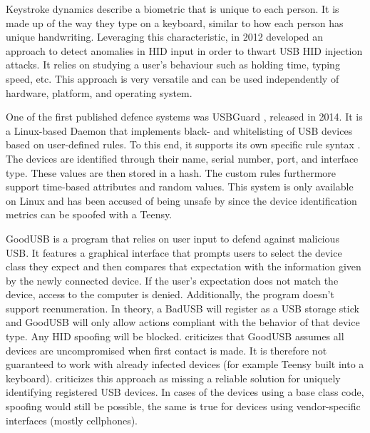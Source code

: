 Keystroke dynamics describe a biometric that is unique to each person. It is made up of the way they type on a keyboard, similar to how each person has unique handwriting. Leveraging this characteristic,  in 2012 \cite{barbhuiyaAnomalyBasedApproach2012} developed an approach to detect anomalies in HID input in order to thwart USB HID injection attacks. It relies on studying a user's behaviour such as holding time, typing speed, etc. This approach is very versatile and can be used independently of hardware, platform, and operating system. 

One of the first published defence systems was USBGuard \cite{HomeUSBGuard}, released in 2014. It is a Linux-based Daemon that implements black- and whitelisting of USB devices based on user-defined rules. To this end, it supports its own specific rule syntax \cite{RuleLanguageUSBGuard}. The devices are identified through their name, serial number, port, and interface type. These values are then stored in a hash. The custom rules furthermore support time-based attributes and random values. This system is only available on Linux and has been accused of being unsafe by \cite{farhiMalboardNovelUser2019} since the device identification metrics can be spoofed with a Teensy. 

GoodUSB \cite{tianDefendingMaliciousUSB2015} is a program that relies on user input to defend against malicious USB. It features a graphical interface that prompts users to select the device class they expect and then compares that expectation with the information given by the newly connected device. If the user's expectation does not match the device, access to the computer is denied. Additionally, the program doesn't support reenumeration. In theory, a BadUSB will register as a USB storage stick and GoodUSB will only allow actions compliant with the behavior of that device type. Any HID spoofing will be blocked. 
\cite{nissimUSBbasedAttacks2017} criticizes that GoodUSB assumes all devices are uncompromised when first contact is made. It is therefore not guaranteed to work with already infected devices (for example Teensy built into a keyboard). 
\cite{mohammadmoradiMakingWhitelistingBaseddefence2018} criticizes this approach as missing a reliable solution for uniquely identifying registered USB devices. In cases of the devices using a base class code, spoofing would still be possible, the same is true for devices using vendor-specific interfaces (mostly cellphones). 

